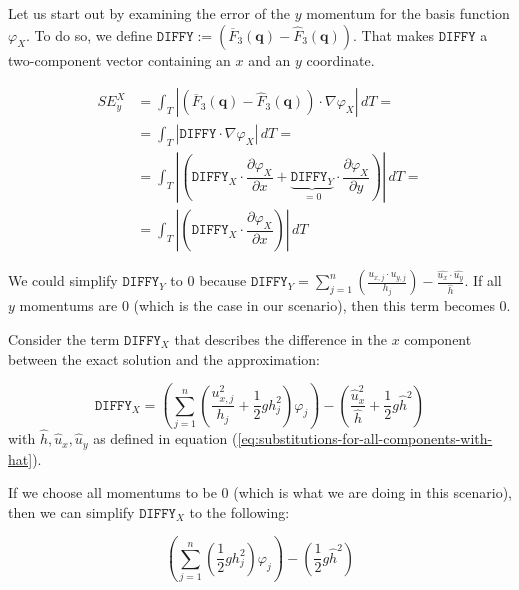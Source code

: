 \documentclass{article}
\newcommand{\pd}[2]{\dfrac{\partial #1}{\partial #2}}
\renewcommand{\phi}{\varphi}
\begin{document}

Let us start out by examining the error of the $y$ momentum for the basis function $\phi_X$. To do so, we define $\mathtt{DIFFY}:=\left( \overline{F}_3(\mathbf{q}) - \widehat{F}_3(\mathbf{q}) \right)$. That makes $\mathtt{DIFFY}$ a two-component vector containing an $x$ and an $y$ coordinate.

\begin{align*}
  SE_y^X &= \int_T \left| \left( \overline{F}_3(\mathbf{q}) - \widehat{F}_3(\mathbf{q}) \right) \cdot \nabla \phi_X \right| \, dT = \\
  &= \int_T \left| \mathtt{DIFFY} \cdot \nabla \phi_X \right|\,dT = \\
  &= \int_T \left| \left( \mathtt{DIFFY}_X \cdot \pd{\phi_X}{x} + \underbrace{\mathtt{DIFFY}_Y}_{=0} \cdot \pd{\phi_X}{y} \right) \right| \, dT = \\
  &=\int_T \left| \left( \mathtt{DIFFY}_X \cdot \pd{\phi_X}{x} \right) \right| \, dT
\end{align*}

We could simplify $\mathtt{DIFFY}_Y$ to 0 because $\mathtt{DIFFY}_Y=\sum_{j=1}^n\left( \frac{u_{x,j}\cdot u_{y,j}}{h_j} \right)-\frac{\widehat{u_x}\cdot\widehat{u_y}}{\widehat{h}}$. If all $y$ momentums are 0 (which is the case in our scenario), then this term becomes 0.

Consider the term $\mathtt{DIFFY}_X$ that describes the difference in the $x$ component between the exact solution and the approximation:

\begin{equation*}
  \mathtt{DIFFY}_X = \left( \sum_{j=1}^n \left(\frac{u_{x,j}^2}{h_j} + \frac{1}{2} g h_j^2\right) \phi_j \right) - \left( \frac{\widehat{u}_x^2}{\widehat h} + \frac{1}{2} g \widehat{h}^2\right)
\end{equation*}
with $\widehat h, \widehat{u}_x, \widehat{u}_y$ as defined in equation (\ref{eq:substitutions-for-all-components-with-hat}).

If we choose all momentums to be 0 (which is what we are doing in this scenario), then we can simplify $\mathtt{DIFFY}_X$ to the following:

\begin{equation*}
  \left( \sum_{j=1}^n \left(\frac{1}{2} g h_j^2\right) \phi_j \right) - \left( \frac{1}{2} g \widehat{h}^2\right)
\end{equation*}
\end{document}
